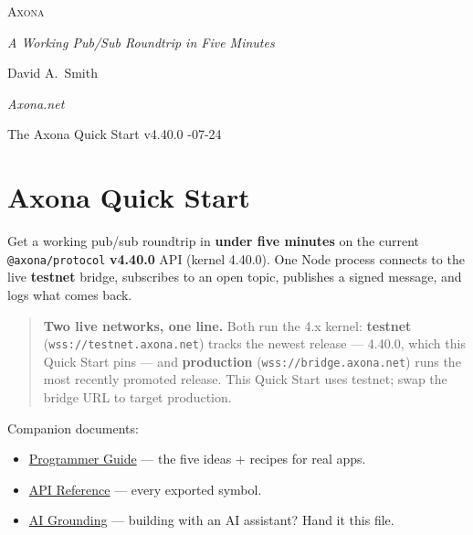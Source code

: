 \documentclass[
  nobib]{tufte-handout}
\author{}
\date{}
\providecommand{\tightlist}{%
  \setlength{\itemsep}{0pt}\setlength{\parskip}{0pt}}
\begin{document}
\thispagestyle{empty}
\null\vfill
\begin{center}
{\fontsize{48}{52}\selectfont \textsc{Axona}\par}
\vspace{0.6em}
{\Large\itshape A Working Pub/Sub Roundtrip in Five Minutes\par}
\vspace{4em}
{\large David A.~Smith\par}
{\itshape\small Axona.net\par}
\vspace{2em}
{\small The Axona Quick Start \quad v4.40.0 -07-24\par}
\end{center}
\vfill
\null
\newpage
\pagestyle{ndhtplain}
\thispagestyle{ndhtplain}
\setcounter{page}{1}

\section{Axona Quick Start}\label{axona-quick-start}

Get a working pub/sub roundtrip in \textbf{under five minutes} on the
current \texttt{@axona/protocol} \textbf{v4.40.0} API (kernel 4.40.0).
One Node process connects to the live \textbf{testnet} bridge,
subscribes to an open topic, publishes a signed message, and logs what
comes back.

\begin{quote}
\textbf{Two live networks, one line.} Both run the 4.x kernel:
\textbf{testnet} (\texttt{wss://testnet.axona.net}) tracks the newest
release --- 4.40.0, which this Quick Start pins --- and
\textbf{production} (\texttt{wss://bridge.axona.net}) runs the most
recently promoted release. This Quick Start uses testnet; swap the
bridge URL to target production.
\end{quote}

Companion documents:

\begin{itemize}
\tightlist
\item
  \href{Axona-Programmer-Guide-v4.38.0.md}{Programmer Guide} --- the
  five ideas + recipes for real apps.
\item
  \href{Axona-API-Reference-v4.40.0.md}{API Reference} --- every
  exported symbol.
\item
  \href{Axona-AI-Grounding-v4.40.0.md}{AI Grounding} --- building with
  an AI assistant? Hand it this file.
\end{itemize}
\end{document}
